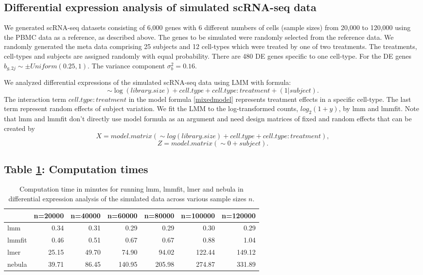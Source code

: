 \documentclass[
]{article}
\begin{document}
\hypertarget{differential-expression-analysis-of-simulated-scrna-seq-data}{%
\subsection{Differential expression analysis of simulated scRNA-seq
data}\label{differential-expression-analysis-of-simulated-scrna-seq-data}}

We generated scRNA-seq datasets consisting of 6,000 genes with 6
different numbers of cells (sample sizes) from 20,000 to 120,000 using
the PBMC data as a reference, as described above. The genes to be
simulated were randomly selected from the reference data. We randomly
generated the meta data comprising 25 subjects and 12 cell-types which
were treated by one of two treatments. The treatments, cell-types and
subjects are assigned randomly with equal probability. There are 480 DE
genes specific to one cell-type. For the DE genes
\(b_{g, 2j}\sim \pm Uniform(0.25, 1)\). The variance component
\(\sigma^2_b = 0.16\).

We analyzed differential expressions of the simulated scRNA-seq data
using LMM with formula: \begin{equation}\label{mixedmodel}
\sim \log(library.size) + cell.type + cell.type:treatment + (1|subject).
\end{equation} The interaction term \(cell.type:treatment\) in the model
formula \eqref{mixedmodel} represents treatment effects in a specific
cell-type. The last term represent random effects of subject variation.
We fit the LMM to the log-transformed counts, \(log_2(1+y)\), by lmm and
lmmfit. Note that lmm and lmmfit don't directly use model formula as an
argument and need design matrices of fixed and random effects that can
be created by \[
X = model.matrix(\sim log(library.size) + cell.type + cell.type:treatment),
\] \[
Z = model.matrix(\sim 0 + subject).
\]

\hypertarget{table-computation-times}{%
\subsection{\texorpdfstring{Table \ref{tab:lmer}: Computation
times}{Table : Computation times}}\label{table-computation-times}}

\begin{table}[ht]
\caption{Computation time in minutes for running lmm, lmmfit, lmer and nebula in differential expression analysis of the simulated data across various sample sizes $n$.} 
\label{tab:lmer}
\centering
\begin{tabular}{lrrrrrr}
  \hline
 & n=20000 & n=40000 & n=60000 & n=80000 & n=100000 & n=120000 \\ 
  \hline
lmm & 0.34 & 0.31 & 0.29 & 0.29 & 0.30 & 0.29 \\ 
  lmmfit & 0.46 & 0.51 & 0.67 & 0.67 & 0.88 & 1.04 \\ 
  lmer & 25.15 & 49.70 & 74.90 & 94.02 & 122.44 & 149.12 \\ 
  nebula & 39.71 & 86.45 & 140.95 & 205.98 & 274.87 & 331.89 \\ 
   \hline
\end{tabular}
\end{table}
\end{document}
